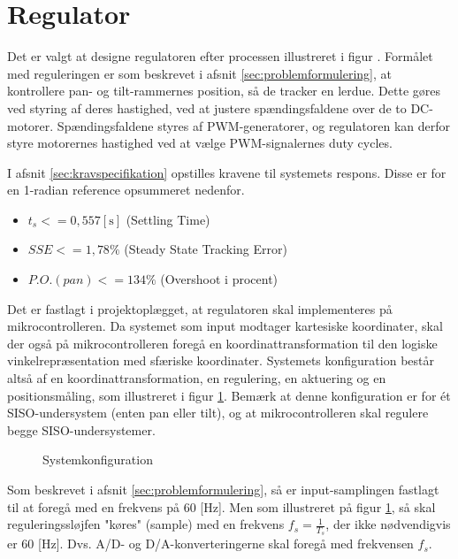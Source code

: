 \section{Regulator}
\label{sec:kontrollerdeign}
Det er valgt at designe regulatoren efter processen illustreret i figur .%
Formålet med reguleringen er som beskrevet i afsnit \ref{sec:problemformulering},
at kontrollere pan- og tilt-rammernes position, så de tracker en lerdue.
Dette gøres ved styring af deres hastighed, ved at justere spændingsfaldene over de
to DC-motorer. Spændingsfaldene styres af PWM-generatorer, og regulatoren
kan derfor styre motorernes hastighed ved at vælge PWM-signalernes duty cycles.

I afsnit \ref{sec:kravspecifikation} opstilles kravene til systemets respons.
Disse er for en 1-radian reference opsummeret nedenfor.
\begin{itemize}
\item \(t_{s} <= 0,557 \mathrm{\left[s\right]}\) (Settling Time)
\item \(SSE <= 1,78 \%\) (Steady State Tracking Error)
\item \(P.O. (pan) <= 134 \%\) (Overshoot i procent)
\end{itemize}

Det er fastlagt i projektoplægget, at regulatoren skal implementeres på mikrocontrolleren.
Da systemet som input modtager kartesiske koordinater,
skal der også på mikrocontrolleren foregå en koordinattransformation
til den logiske vinkelrepræsentation med sfæriske koordinater.
Systemets konfiguration består altså af en koordinattransformation,
en regulering, en aktuering og en positionsmåling, som illustreret
i figur \ref{fig:digitalkontroller1}.
Bemærk at denne konfiguration er for ét SISO-undersystem (enten pan eller tilt),
og at mikrocontrolleren skal regulere begge SISO-undersystemer.
\begin{figure}[!th]
\centering
\begin{tikzpicture}[auto, node distance=2.6cm,>=latex']

\end{tikzpicture}
\caption[Systemkonfiguration]{Systemkonfiguration}
\label{fig:digitalkontroller1}
\end{figure}
Som beskrevet i afsnit \ref{sec:problemformulering},
så er input-samplingen fastlagt til at foregå med en frekvens på 60 [Hz].
Men som illustreret på figur \ref{fig:digitalkontroller1}, så skal reguleringssløjfen
"køres" (sample) med en frekvens \(f_s=\frac{1}{T_s}\), der ikke nødvendigvis er 60 [Hz].
Dvs. A/D- og D/A-konverteringerne skal foregå med frekvensen \(f_s\).






